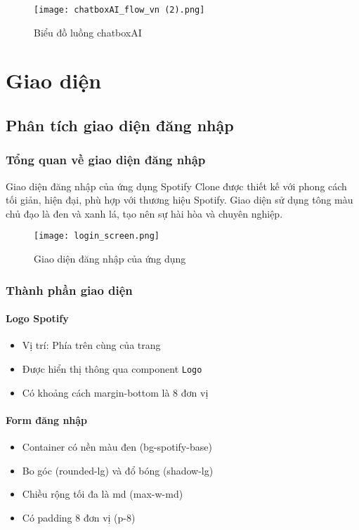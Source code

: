 \documentclass{book}
\let\oldsection\section
\renewcommand{\section}{\clearpage\oldsection}
\begin{document}
\begin{figure}[htbp]
    \centering
    \texttt{[image: chatboxAI\_flow\_vn (2).png]}
    \caption{Biểu đồ luồng chatboxAI}
    \label{fig:purchase_flow}
\end{figure}

\chapter{Giao diện}
\section{Phân tích giao diện đăng nhập}

\subsection{Tổng quan về giao diện đăng nhập}
Giao diện đăng nhập của ứng dụng Spotify Clone được thiết kế với phong cách tối giản, hiện đại, phù hợp với thương hiệu Spotify. Giao diện sử dụng tông màu chủ đạo là đen và xanh lá, tạo nên sự hài hòa và chuyên nghiệp.

\begin{figure}[h!]
\centering
\texttt{[image: login\_screen.png]}
\caption{Giao diện đăng nhập của ứng dụng}
\label{fig:login}
\end{figure}

\subsection{Thành phần giao diện}

\subsubsection{Logo Spotify}
\begin{itemize}
    \item Vị trí: Phía trên cùng của trang
    \item Được hiển thị thông qua component \texttt{Logo}
    \item Có khoảng cách margin-bottom là 8 đơn vị
\end{itemize}

\subsubsection{Form đăng nhập}
\begin{itemize}
    \item Container có nền màu đen (bg-spotify-base)
    \item Bo góc (rounded-lg) và đổ bóng (shadow-lg)
    \item Chiều rộng tối đa là md (max-w-md)
    \item Có padding 8 đơn vị (p-8)
\end{itemize}
\end{document}
